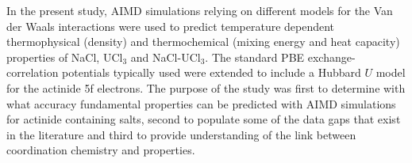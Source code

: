 \documentclass[preprint,3p,10pt,twocolumn,number,sort&compress]{elsarticle}
\begin{document}
In the present study, AIMD simulations relying on different models for the Van der Waals interactions were used to predict temperature dependent thermophysical (density) and thermochemical (mixing energy and heat capacity) properties of NaCl, UCl$_3$ and NaCl-UCl$_3$. The standard PBE exchange-correlation potentials typically used were extended to include a Hubbard $U$ model for the actinide 5f electrons. The purpose of the study was first to determine with what accuracy fundamental properties can be predicted with AIMD simulations for actinide containing salts, second to populate some of the data gaps that exist in the literature and third to provide understanding of the link between coordination chemistry and properties. 


 
\end{document}
